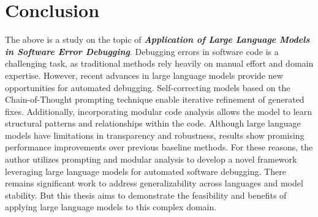 \documentclass[a4paper,oneside]{book}
\begin{document}
\chapter{Conclusion}
The above is a study on the topic of \textbf{\textit{Application of Large Language Models in Software Error Debugging}}. Debugging errors in software code is a challenging task, as traditional methods rely heavily on manual effort and domain expertise. However, recent advances in large language models provide new opportunities for automated debugging. Self-correcting models based on the Chain-of-Thought prompting technique enable iterative refinement of generated fixes. Additionally, incorporating modular code analysis allows the model to learn structural patterns and relationships within the code. Although large language models have limitations in transparency and robustness, results show promising performance improvements over previous baseline methods. For these reasons, the author utilizes prompting and modular analysis to develop a novel framework leveraging large language models for automated software debugging. There remains significant work to address generalizability across languages and model stability. But this thesis aims to demonstrate the feasibility and benefits of applying large language models to this complex domain.

\newpage
\renewcommand{\bibname}{References}

\end{document}
